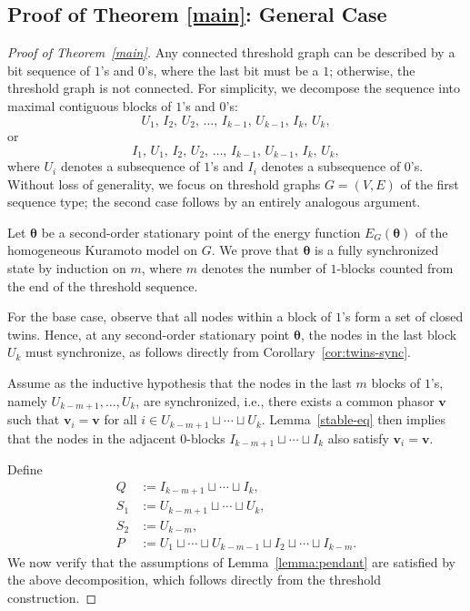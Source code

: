 \documentclass[11pt,reqno]{amsart}
\theoremstyle{definition}
\begin{document}
\subsection{Proof of Theorem \ref{main}: General Case}
\begin{proof}[Proof of Theorem~\ref{main}]
Any connected threshold graph can be described by a bit sequence of $1$'s and $0$'s, where the last bit must be a $1$; otherwise, the threshold graph is not connected.
For simplicity, we decompose the sequence into maximal contiguous blocks of $1$'s and $0$'s:
\[
U_1,\, I_2,\, U_2,\, \dots,\, I_{k-1},\, U_{k-1},\, I_k,\, U_k,
\]
or
\[
I_1,\, U_1,\, I_2,\, U_2,\, \dots,\, I_{k-1},\, U_{k-1},\, I_k,\, U_k,
\]
where $U_i$ denotes a subsequence of $1$'s and $I_i$ denotes a subsequence of $0$'s.
Without loss of generality, we focus on threshold graphs $G=(V,E)$ of the first sequence type; the second case follows by an entirely analogous argument.

Let $\boldsymbol{\theta}$ be a second-order stationary point of the energy function $E_G(\boldsymbol{\theta})$ of the homogeneous Kuramoto model on $G$.
We prove that $\boldsymbol{\theta}$ is a fully synchronized state by induction on $m$, where $m$ denotes the number of $1$-blocks counted from the end of the threshold sequence.

For the base case, observe that all nodes within a block of $1$'s form a set of closed twins.
Hence, at any second-order stationary point $\boldsymbol{\theta}$, the nodes in the last block $U_k$ must synchronize, as follows directly from Corollary~\ref{cor:twins-sync}.

Assume as the inductive hypothesis that the nodes in the last $m$ blocks of $1$'s, namely $U_{k-m+1}, \ldots, U_k$, are synchronized, i.e., there exists a common phasor $\boldsymbol{v}$ such that $\boldsymbol{v}_i = \boldsymbol{v}$ for all $i \in U_{k-m+1} \sqcup \cdots \sqcup U_k$. Lemma~\ref{stable-eq} then implies that the nodes in the adjacent $0$-blocks $I_{k-m+1} \sqcup \cdots \sqcup I_k$ also satisfy $\boldsymbol{v}_i = \boldsymbol{v}$.

Define
\[
\begin{aligned}
Q   &:= I_{k-m+1} \sqcup \cdots \sqcup I_k, \\
S_1 &:= U_{k-m+1} \sqcup \cdots \sqcup U_k, \\
S_2 &:= U_{k-m}, \\
P   &:= U_1 \sqcup \cdots \sqcup U_{k-m-1}
         \sqcup I_2 \sqcup \cdots \sqcup I_{k-m}.
\end{aligned}
\]
We now verify that the assumptions of Lemma~\ref{lemma:pendant} are satisfied by the above
decomposition, which follows directly from the threshold construction.


\end{proof}
\end{document}
